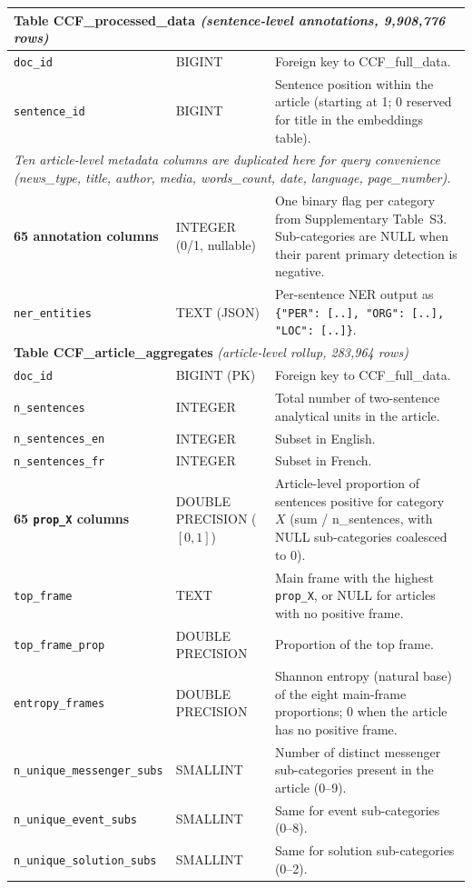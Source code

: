 \begin{longtable}{p{3.6cm}p{2.4cm}p{16.5cm}}
\multicolumn{3}{l}{\cellcolor{gray!12}\textbf{Table CCF\_processed\_data} \emph{(sentence-level annotations, 9{,}908{,}776 rows)}} \\
\midrule
\texttt{doc\_id}             & BIGINT       & Foreign key to CCF\_full\_data. \\
\texttt{sentence\_id}        & BIGINT       & Sentence position within the article (starting at 1; 0 reserved for title in the embeddings table). \\
\multicolumn{3}{l}{\textit{Ten article-level metadata columns are duplicated here for query convenience (news\_type, title, author, media, words\_count, date, language, page\_number).}} \\
\midrule
\textbf{65 annotation columns} & INTEGER (0/1, nullable) & One binary flag per category from Supplementary Table~S3. Sub-categories are NULL when their parent primary detection is negative. \\
\texttt{ner\_entities}       & TEXT (JSON)  & Per-sentence NER output as \texttt{\{"PER": [..], "ORG": [..], "LOC": [..]\}}. \\
\midrule

\multicolumn{3}{l}{\cellcolor{gray!12}\textbf{Table CCF\_article\_aggregates} \emph{(article-level rollup, 283{,}964 rows)}} \\
\midrule
\texttt{doc\_id}                  & BIGINT (PK)   & Foreign key to CCF\_full\_data. \\
\texttt{n\_sentences}             & INTEGER       & Total number of two-sentence analytical units in the article. \\
\texttt{n\_sentences\_en}         & INTEGER       & Subset in English. \\
\texttt{n\_sentences\_fr}         & INTEGER       & Subset in French. \\
\textbf{65 \texttt{prop\_X} columns} & DOUBLE PRECISION ($[0, 1]$) & Article-level proportion of sentences positive for category $X$ (sum / n\_sentences, with NULL sub-categories coalesced to 0). \\
\texttt{top\_frame}               & TEXT          & Main frame with the highest \texttt{prop\_X}, or NULL for articles with no positive frame. \\
\texttt{top\_frame\_prop}         & DOUBLE PRECISION & Proportion of the top frame. \\
\texttt{entropy\_frames}          & DOUBLE PRECISION & Shannon entropy (natural base) of the eight main-frame proportions; 0 when the article has no positive frame. \\
\texttt{n\_unique\_messenger\_subs} & SMALLINT     & Number of distinct messenger sub-categories present in the article (0--9). \\
\texttt{n\_unique\_event\_subs}    & SMALLINT      & Same for event sub-categories (0--8). \\
\texttt{n\_unique\_solution\_subs} & SMALLINT      & Same for solution sub-categories (0--2). \\
\midrule


\end{longtable}

